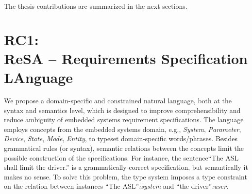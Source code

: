 The thesis contributions are summarized in the next sections. 
\section[RC1: {\sffamily \resa{}} -- \textbf{Re}quirements \textbf{S}pecification L\textbf{A}nguage]{RC1: \\{\sffamily ReSA} -- \textbf{Re}quirements \textbf{S}pecification L\textbf{A}nguage}\label{rc_resa}
We propose a domain-specific and constrained natural language, both at the syntax and semantics level, which is designed to improve comprehensibility and reduce ambiguity of embedded systems requirement specifications. The language employs concepts from the embedded systems domain, e.g., \textit{System}, \textit{Parameter}, \textit{Device}, \textit{State}, \textit{Mode}, \textit{Entity}, to typeset domain-specific words/phrases. Besides grammatical rules (or syntax), semantic relations between the concepts limit the possible construction of the specifications. For instance, the sentence``The ASL shall limit the driver.'' is a grammatically-correct specification, but semantically it makes no sense. To solve this problem, the \resa{} type system imposes a type constraint on the relation between instances ``The ASL''\textit{:system} and ``the driver''\textit{:user}.

